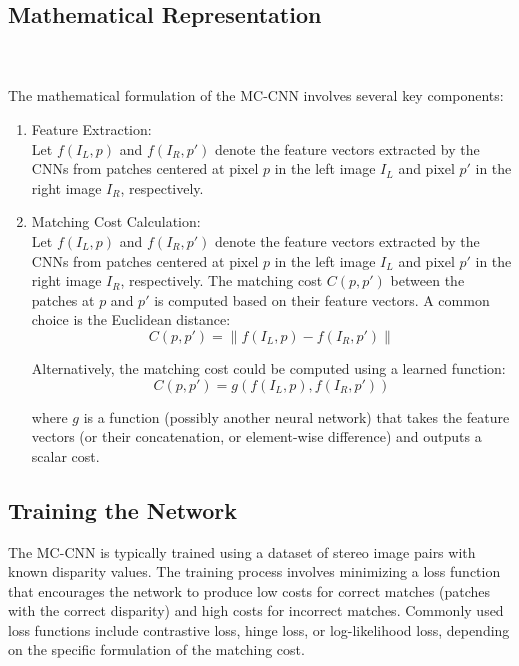 \documentclass[22pt]{report}
\begin{document}
\subsection{Mathematical Representation} \\ \\
The mathematical formulation of the MC-CNN involves several key components:
\begin{enumerate}
    \item Feature Extraction: \\
    Let \( f(I_L, p) \) and \( f(I_R, p') \) denote the feature vectors extracted by the CNNs from patches centered at pixel \( p \) in the left image \( I_L \) and pixel \( p' \) in the right image \( I_R \), respectively.
    \item Matching Cost Calculation:\\
    Let \( f(I_L, p) \) and \( f(I_R, p') \) denote the feature vectors extracted by the CNNs from patches centered at pixel \( p \) in the left image \( I_L \) and pixel \( p' \) in the right image \( I_R \), respectively.
    The matching cost \( C(p, p') \) between the patches at \( p \) and \( p' \) is computed based on their feature vectors. A common choice is the Euclidean distance:
    \[
    C(p, p') = \| f(I_L, p) - f(I_R, p') \|
    \]
    
    Alternatively, the matching cost could be computed using a learned function:
    \[
    C(p, p') = g(f(I_L, p), f(I_R, p'))
    \]
    
    where \( g \) is a function (possibly another neural network) that takes the feature vectors (or their concatenation, or element-wise difference) and outputs a scalar cost.
\end{enumerate}

\subsection{Training the Network}
The MC-CNN is typically trained using a dataset of stereo image pairs with known disparity values. The training process involves minimizing a loss function that encourages the network to produce low costs for correct matches (patches with the correct disparity) and high costs for incorrect matches. Commonly used loss functions include contrastive loss, hinge loss, or log-likelihood loss, depending on the specific formulation of the matching cost.
\vspace{15}
\end{document}
